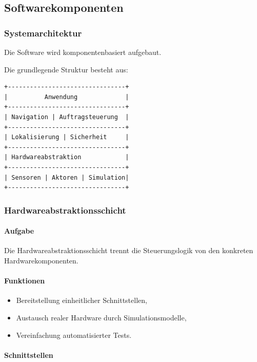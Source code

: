 \documentclass[
  a4paper,
  12pt,
  DIV=12,        %
  parskip=half,  %
  headings=small %
]{scrartcl}
\theoremstyle{definition}
\providecommand{\tightlist}{%
  \setlength{\itemsep}{0pt}\setlength{\parskip}{0pt}}
\theoremstyle{definition}
\begin{document}
\subsection{Softwarekomponenten}\label{softwarekomponenten}

\subsubsection{Systemarchitektur}\label{systemarchitektur-1}

Die Software wird komponentenbasiert aufgebaut.

Die grundlegende Struktur besteht aus:

\begin{verbatim}
+--------------------------------+
|          Anwendung             |
+--------------------------------+
| Navigation | Auftragsteuerung  |
+--------------------------------+
| Lokalisierung | Sicherheit     |
+--------------------------------+
| Hardwareabstraktion            |
+--------------------------------+
| Sensoren | Aktoren | Simulation|
+--------------------------------+
\end{verbatim}

\subsubsection{Hardwareabstraktionsschicht}\label{hardwareabstraktionsschicht}

\paragraph{Aufgabe}\label{aufgabe-6}

Die Hardwareabstraktionsschicht trennt die Steuerungslogik von den
konkreten Hardwarekomponenten.

\paragraph{Funktionen}\label{funktionen}

\begin{itemize}
\tightlist
\item
  Bereitstellung einheitlicher Schnittstellen,
\item
  Austausch realer Hardware durch Simulationsmodelle,
\item
  Vereinfachung automatisierter Tests.
\end{itemize}

\paragraph{Schnittstellen}\label{schnittstellen}
\end{document}
